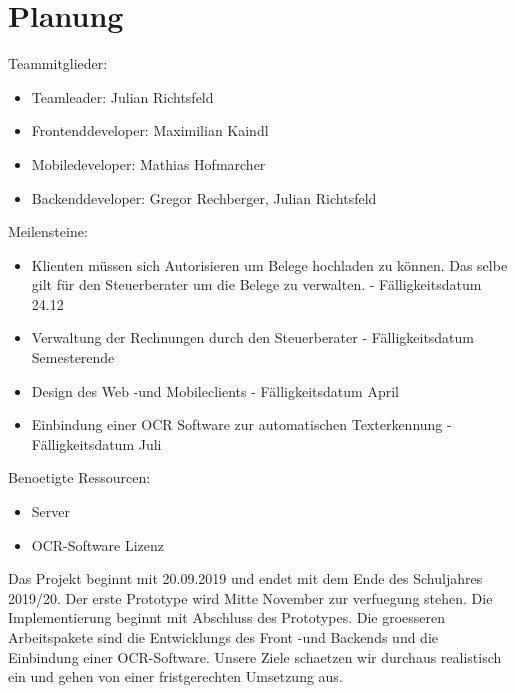 \documentclass[12pt]{article}
\theoremstyle{definition}
\begin{document}
\pagebreak
\section{Planung}
Teammitglieder:
\begin{itemize}
\item Teamleader: Julian Richtsfeld
\item Frontenddeveloper: Maximilian Kaindl
\item Mobiledeveloper: Mathias Hofmarcher
\item Backenddeveloper: Gregor Rechberger, Julian Richtsfeld \hfill
\end{itemize}
Meilensteine:
\begin{itemize}
\item Klienten müssen sich Autorisieren um Belege hochladen zu können. Das selbe gilt für den Steuerberater um die Belege zu verwalten. - Fälligkeitsdatum 24.12
\item Verwaltung der Rechnungen durch den Steuerberater - Fälligkeitsdatum Semesterende
\item Design des Web -und Mobileclients - Fälligkeitsdatum April
\item Einbindung einer OCR Software zur automatischen Texterkennung - Fälligkeitsdatum Juli\hfill
\end{itemize}
Benoetigte Ressourcen:
\begin{itemize}
\item Server
\item OCR-Software Lizenz
\end{itemize}
Das Projekt beginnt mit 20.09.2019 und endet mit dem Ende des Schuljahres 2019/20. Der erste Prototype wird Mitte November zur verfuegung stehen. Die Implementierung beginnt mit Abschluss des Prototypes. Die groesseren Arbeitspakete sind die Entwicklungs des Front -und Backends und die Einbindung einer OCR-Software. Unsere Ziele schaetzen wir durchaus realistisch ein und gehen von einer fristgerechten Umsetzung aus.
\end{document}

